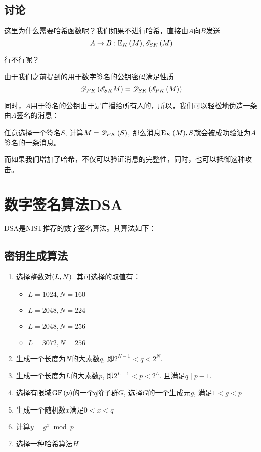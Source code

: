 \subsection{讨论}
这里为什么需要哈希函数呢？我们如果不进行哈希，直接由$A$向$B$发送
\[A\to B:{\mathrm{E}_{K}\left({M}\right)},\mathscr{E}_{SK}\left( {M}\right)\]

行不行呢？\par
由于我们之前提到的用于数字签名的公钥密码满足性质
\[\mathscr{D}_{PK}\left( {\mathscr{E}_{SK}{M}}\right)=\mathscr{D}_{SK}\left( {\mathscr{E}_{PK}\left( {M}\right)}\right)\]

同时，$A$用于签名的公钥由于是广播给所有人的，所以，我们可以轻松地伪造一条由$A$签名的消息：\par
任意选择一个签名$S$, 计算$M=\mathscr{D}_{PK}\left( {S}\right)$, 那么消息${\mathrm{E}_{K}\left({M}\right)}, S$就会被成功验证为$A$签名的一条消息。\par
而如果我们增加了哈希，不仅可以验证消息的完整性，同时，也可以抵御这种攻击。
\section{数字签名算法DSA}
DSA是NIST推荐的数字签名算法。其算法如下：
\subsection{密钥生成算法}
\begin{enumerate}
    \item 选择整数对$\left( {L, N}\right)$. 其可选择的取值有：
    \begin{itemize}
        \item $L=1024, N=160$
        \item $L=2048, N=224$
        \item $L=2048, N=256$
        \item $L=3072, N=256$
    \end{itemize}

    \item 生成一个长度为$N$的大素数$q$, 即$2^{N-1} < q < 2^N$.
    \item 生成一个长度为$L$的大素数$p$, 即$2^{L-1} < p < 2^L$. 且满足$q\mid p - 1$.
    \item 选择有限域$\mathrm{GF}\left( {p}\right)$的一个$q$阶子群$G$, 选择$G$的一个生成元$g$, 满足$1<g<p$
    \item 生成一个随机数$x$满足$0<x<q$
    \item 计算$y=g^x\bmod{p}$
    \item 选择一种哈希算法$H$
\end{enumerate}

